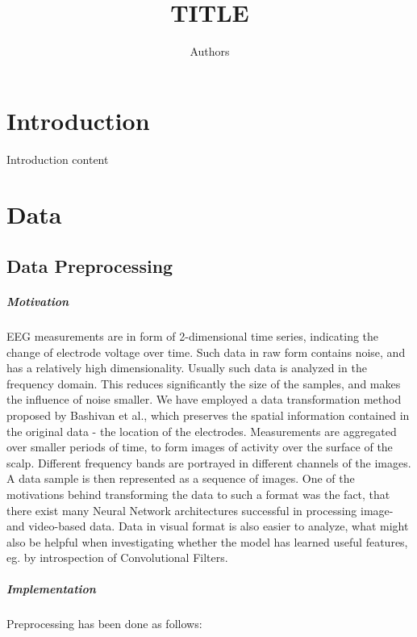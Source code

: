 \documentclass{article}
\title{TITLE}
\author{Authors}
\begin{document}
\maketitle
{}
	

\maketitle

\section{Introduction}
Introduction content

\section{Data}
\subsection{Data Preprocessing}

\subparagraph{Motivation} EEG measurements are in form of 2-dimensional time series, indicating the change of electrode voltage over time. Such data in raw form contains noise, and has a relatively high dimensionality. Usually such data is analyzed in the frequency domain. This reduces significantly the size of the samples, and makes the influence of noise smaller. We have employed a data transformation method proposed by Bashivan et al.\cite{learning_eeg_repr}, which preserves the spatial information contained in the original data - the location of the electrodes. Measurements are aggregated over smaller periods of time, to form images of activity over the surface of the scalp. Different frequency bands are portrayed in different channels of the images. A data sample is then represented as a sequence of images. One of the motivations behind transforming the data to such a format was the fact, that there exist many Neural Network architectures successful in processing image- and video-based data. Data in visual format is also easier to analyze, what might also be helpful when investigating whether the model has learned useful features, eg. by introspection of Convolutional Filters. %

\subparagraph{Implementation} Preprocessing has been done as follows:
\end{document}
